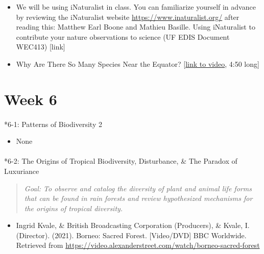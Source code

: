 \documentclass[
  10pt,
  letterpaper,
  oneside,
  open=any]{scrbook}
\makeatletter
\let\oldparagraph\paragraph
\renewcommand{\paragraph}{
    \@ifstar
      \xxxParagraphStar
      \xxxParagraphNoStar
  }
\newcommand{\xxxParagraphStar}[1]{\oldparagraph*{#1}\mbox{}}
\newcommand{\xxxParagraphNoStar}[1]{\oldparagraph{#1}\mbox{}}
\providecommand{\tightlist}{%
  \setlength{\itemsep}{0pt}\setlength{\parskip}{0pt}}
\makeatother
\begin{document}
\begin{itemize}
\item
  We will be using iNaturalist in class. You can familiarize yourself in
  advance by reviewing the iNaturalist website
  \url{https://www.inaturalist.org/} after reading this: Matthew Earl
  Boone and Mathieu Basille. Using iNaturalist to contribute your nature
  observations to science (UF EDIS Document WEC413) {[}link{]}
\item
  Why Are There So Many Species Near the Equator?
  {[}\href{https://www.youtube.com/watch?v=IrbKix96_k0}{link to video},
  4:50 long{]}
\end{itemize}

\section*{Week 6}\label{week-6}


\paragraph*{6-1: Patterns of Biodiversity
2}\label{patterns-of-biodiversity-2}

\begin{itemize}
\tightlist
\item
  None
\end{itemize}

\paragraph*{6-2: The Origins of Tropical Biodiversity, Disturbance, \&
The Paradox of
Luxuriance}\label{the-origins-of-tropical-biodiversity-disturbance-the-paradox-of-luxuriance}

\begin{quote}
\emph{Goal: To observe and catalog the diversity of plant and animal
life forms that can be found in rain forests and review hypothesized
mechanisms for the origins of tropical diversity.}
\end{quote}

\begin{itemize}
\tightlist
\item
  Ingrid Kvale, \& British Broadcasting Corporation (Producers), \&
  Kvale, I. (Director). (2021). Borneo: Sacred Forest. {[}Video/DVD{]}
  BBC Worldwide. Retrieved from
  \url{https://video.alexanderstreet.com/watch/borneo-sacred-forest}
\end{itemize}
\end{document}
